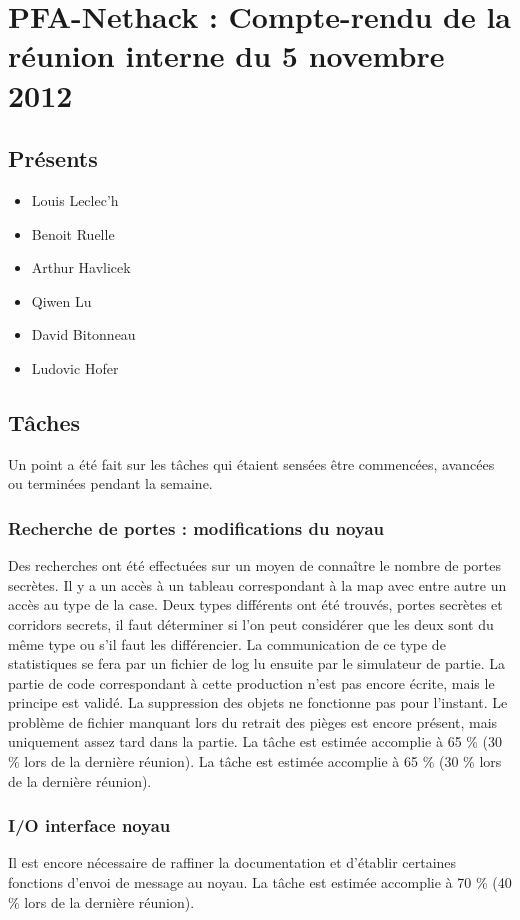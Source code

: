 \documentclass{article}
\newcommand {\QL}{Qiwen Lu}
\newcommand {\LL}{Louis Leclec'h}
\newcommand {\DB}{David Bitonneau}
\newcommand {\AH}{Arthur Havlicek}
\newcommand {\BR}{Benoit Ruelle}
\newcommand {\LH}{Ludovic Hofer}
\newcommand {\accomplished}[2]{La tâche est estimée accomplie à #1 \%
(#2 \% lors de la dernière réunion).}
\begin{document}
\section*{PFA-Nethack : Compte-rendu de la réunion interne du 5 novembre 2012}

\subsection*{Présents}
\begin{itemize}
\item \LL
\item \BR
\item \AH
\item \QL
\item \DB
\item \LH
\end{itemize}

\subsection*{Tâches}
Un point a été fait sur les tâches qui étaient sensées être commencées,
avancées ou terminées pendant la semaine.

\subsubsection*{Recherche de portes : modifications du noyau}
Des recherches ont été effectuées sur un moyen de connaître le nombre
de portes secrètes. Il y a un accès à un tableau correspondant à la map avec
entre autre un accès au type de la case. Deux types différents ont été trouvés,
portes secrètes et corridors secrets, il faut déterminer si l'on peut
considérer que les deux sont du même type ou s'il faut les différencier.
La communication de ce type de statistiques se fera par un fichier de log lu
ensuite par le simulateur de partie. La partie de code correspondant à cette
production n'est pas encore écrite, mais le principe est validé.
La suppression des objets ne fonctionne pas pour l'instant.
Le problème de fichier manquant lors du retrait des pièges est encore présent,
mais uniquement assez tard dans la partie.
\accomplished{65}{30}
La tâche est estimée accomplie à 65 \% (30 \% lors de la dernière réunion).

\subsubsection*{I/O interface noyau}
Il est encore nécessaire de raffiner la documentation et d'établir certaines
fonctions d'envoi de message au noyau.
\accomplished{70}{40}
\end{document}
